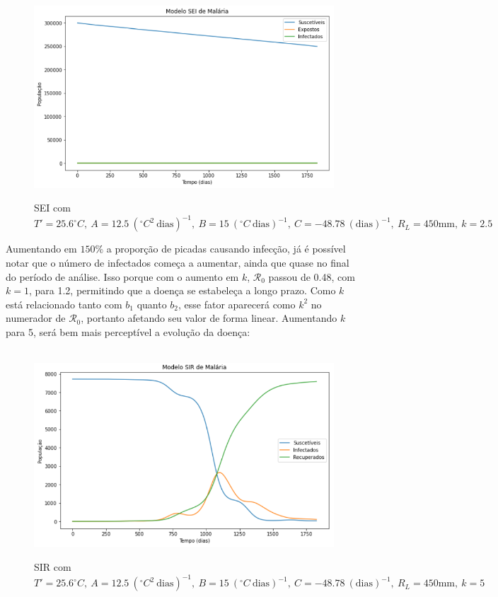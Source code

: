 \documentclass[12pt]{article}
\begin{document}
\begin{figure}[!ht]
        \centering
        \hbox{\hspace{1.5em} \includegraphics[scale=0.7] {Correcao_SEI_Desmat_k=2_5.png}}
        \caption{SEI com $T'=25.6 ^\circ C, \ A=12.5 \ (^\circ C^2 \ \text{dias})^{-1}, \ B=15 \ (^\circ C \ \text{dias})^{-1}, \ C=-48.78 \ (\text{dias})^{-1}, \ R_L=450 \text{mm}, \ k=2.5$}
\end{figure} 
\newpage
Aumentando em $150\%$ a proporção de picadas causando infecção, já é possível notar que o 
número de infectados começa a aumentar, ainda que quase no final do período 
de análise. Isso porque com o aumento em $k$, $\mathcal{R}_0$ passou de 0.48, 
com $k=1$, para 1.2, permitindo que a doença se estabeleça a longo prazo. Como $k$
está relacionado tanto com $b_1$ quanto $b_2$, esse fator aparecerá como $k^2$ no
numerador de $\mathcal{R}_0$, portanto afetando seu valor de forma linear.
Aumentando $k$ para 5, será bem mais perceptível a evolução da doença:
\begin{figure}[!ht]
        \centering
        \hbox{\hspace{3.7em} \includegraphics[scale=0.6] {Correcao_SIR_Desmat_k=5.png}}
        \caption{SIR com $T'=25.6 ^\circ C, \ A=12.5 \ (^\circ C^2 \ \text{dias})^{-1}, \ B=15 \ (^\circ C \ \text{dias})^{-1}, \ C=-48.78 \ (\text{dias})^{-1}, \ R_L=450 \text{mm}, \ k=5$}
\end{figure} 
\end{document}
